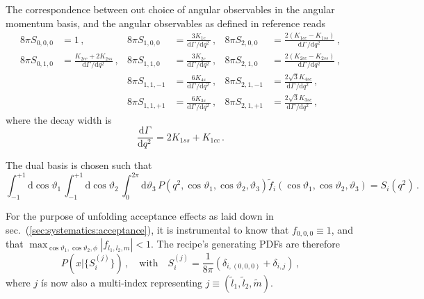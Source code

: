 \documentclass[aps,prd,reprint,nofootinbib,preprintnumbers]{revtex4}
\newcommand{\dual}[1]{\tilde{#1}}
\newcommand{\refsec}[1]{sec.~(\ref{sec:#1})}
\newcommand{\rmdx}[1]{\mbox{d} #1 \,} %
\renewcommand{\theta}{\vartheta}
\begin{document}
The correspondence between out choice of angular observables in the angular momentum basis, and the angular
observables as defined in reference \cite{Boeer:2014xx} reads
\begin{equation}
\begin{aligned}
    8\pi S_{0, 0,  0} & = 1\,,                                                             &
    8\pi S_{1, 0,  0} & = \frac{3 K_{1c}}{\rmdx\Gamma/\rmdx{q^2}}\,,                       &
    8\pi S_{2, 0,  0} & = \frac{2(K_{1cc} - K_{1ss})}{\rmdx\Gamma/\rmdx{q^2}}\,,           \\
    8\pi S_{0, 1,  0} & = \frac{K_{2cc} + 2 K_{2ss}}{\rmdx\Gamma/\rmdx{q^2}}\,,            &
    8\pi S_{1, 1,  0} & = \frac{3 K_{2c}}{\rmdx\Gamma/\rmdx{q^2}}\,,                       &
    8\pi S_{2, 1,  0} & = \frac{2(K_{2cc} - K_{2ss})}{\rmdx\Gamma/\rmdx{q^2}}\,,           \\
                 &                                                                    &
    8\pi S_{1, 1, -1} & = \frac{6 K_{4s}}{\rmdx\Gamma/\rmdx{q^2}}\,,                       &
    8\pi S_{2, 1, -1} & = \frac{2 \sqrt{3} K_{4sc}}{\rmdx\Gamma/\rmdx{q^2}}\,,             \\
                 &                                                                    &
    8\pi S_{1, 1, +1} & = \frac{6 K_{3s}}{\rmdx\Gamma/\rmdx{q^2}}\,,                       &
    8\pi S_{2, 1, +1} & = \frac{2 \sqrt{3} K_{3sc}}{\rmdx\Gamma/\rmdx{q^2}}\,,
\end{aligned}
\end{equation}
where the decay width is
\begin{equation}
    \frac{\rmdx{\Gamma}} {\rmdx{q^2}} = 2 K_{1ss} + K_{1cc}\,.
\end{equation}

The dual basis is chosen such that
\begin{equation}
    \int_{-1}^{+1} \rmdx{\cos \theta_1} \int_{-1}^{+1} \rmdx{\cos \theta_2} \int_0^{2\pi} \rmdx{\theta_3} P(q^2, \cos \theta_1, \cos \theta_2, \theta_3) \dual{f}_i(\cos \theta_1, \cos \theta_2, \theta_3) = S_i(q^2)\,.
\end{equation}

For the purpose of unfolding acceptance effects as laid down in \refsec{systematics:acceptance}, it is instrumental
to know that $f_{0,0,0} \equiv 1$, and that $\max_{\cos\theta_1,\cos\theta_2,\phi} |f_{l_1, l_2, m}| < 1$.
The recipe's generating PDFs are therefore
\begin{equation}
    P(x|\lbrace S_i^{(j)}\rbrace)\,,\quad\text{with}\quad S_i^{(j)} = \frac{1}{8\pi}\left(\delta_{i,(0,0,0)} + \delta_{i,j}\right)\,,
\end{equation}
where $j$ ís now also a multi-index representing $j \equiv (\tilde l_1, \tilde l_2, \tilde m)$.
\end{document}

